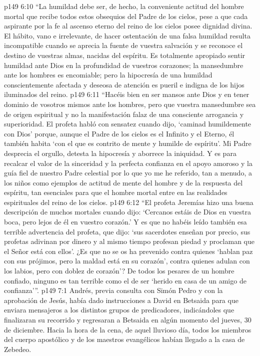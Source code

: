 \vs p149 6:10 “La humildad debe ser, de hecho, la conveniente actitud del hombre mortal que recibe todos estos obsequios del Padre de los cielos, pese a que cada aspirante por la fe al ascenso eterno del reino de los cielos posee dignidad divina. El hábito, vano e irrelevante, de hacer ostentación de una falsa humildad resulta incompatible cuando se aprecia la fuente de vuestra salvación y se reconoce el destino de vuestras almas, nacidas del espíritu. Es totalmente apropiado sentir humildad ante Dios en la profundidad de vuestros corazones; la mansedumbre ante los hombres es encomiable; pero la hipocresía de una humildad conscientemente afectada y deseosa de atención es pueril e indigna de los hijos iluminados del reino.
\vs p149 6:11 “Hacéis bien en ser mansos ante Dios y en tener dominio de vosotros mismos ante los hombres, pero que vuestra mansedumbre sea de origen espiritual y no la manifestación falaz de una consciente arrogancia y superioridad. El profeta habló con sensatez cuando dijo, ‘caminad humildemente con Dios’ porque, aunque el Padre de los cielos es el Infinito y el Eterno, él también habita ‘con el que es contrito de mente y humilde de espíritu’. Mi Padre desprecia el orgullo, detesta la hipocresía y aborrece la iniquidad. Y es para recalcar el valor de la sinceridad y la perfecta confianza en el apoyo amoroso y la guía fiel de nuestro Padre celestial por lo que yo me he referido, tan a menudo, a los niños como ejemplos de actitud de mente del hombre y de la respuesta del espíritu, tan esenciales para que el hombre mortal entre en las realidades espirituales del reino de los cielos.
\vs p149 6:12 “El profeta Jeremías hizo una buena descripción de muchos mortales cuando dijo: ‘Cercanos estáis de Dios en vuestra boca, pero lejos de él en vuestro corazón.’ Y es que no habéis leído también esa terrible advertencia del profeta, que dijo: ‘sus sacerdotes enseñan por precio, sus profetas adivinan por dinero y al mismo tiempo profesan piedad y proclaman que el Señor está con ellos’. ¿Es que no se os ha prevenido contra quienes ‘hablan paz con sus prójimos, pero la maldad está en su corazón’, contra quienes adulan con los labios, pero con doblez de corazón’? De todos los pesares de un hombre confiado, ninguno es tan terrible como el de ser ‘herido en casa de un amigo de confianza’”.
\vs p149 7:1 Andrés, previa consulta con Simón Pedro y con la aprobación de Jesús, había dado instrucciones a David en Betsaida para que enviara mensajeros a los distintos grupos de predicadores, indicándoles que finalizaran su recorrido y regresaran a Betsaida en algún momento del jueves, 30 de diciembre. Hacia la hora de la cena, de aquel lluvioso día, todos los miembros del cuerpo apostólico y de los maestros evangélicos habían llegado a la casa de Zebedeo.
